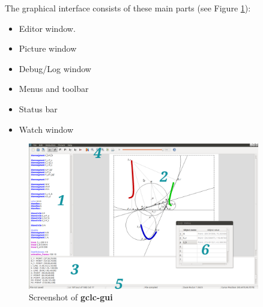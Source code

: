 \documentclass[a4paper]{book}
\newcommand{\gclcgui}{{\bfseries gclc-gui}\xspace}
\begin{document}
The graphical interface consists of these main parts (see Figure \ref{fig:screenshot}):
\begin{itemize}
\item[1] Editor window.
\item[2] Picture window
\item[3] Debug/Log window
\item[4] Menus and toolbar
\item[5] Status bar
\item[6] Watch window
\end{itemize}

\begin{figure}[ht]
\begin{center}
\hspace*{0cm}
\includegraphics[width=0.9\textwidth]{figures/gclc-gui.png}
\end{center}
\caption{Screenshot of \gclcgui}
\label{fig:screenshot}
\end{figure}
\end{document}
